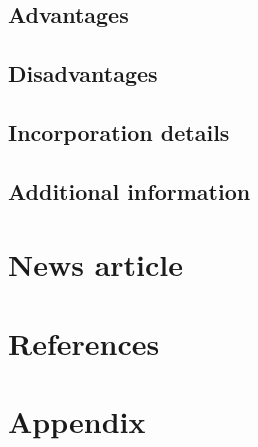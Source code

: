 \documentclass[12pt]{article}
\begin{document}
\subsection{Advantages}

\subsection{Disadvantages}

\subsection{Incorporation details}

\subsection{Additional information}


\section{News article}
\newpage


\pagestyle{fancy}
\newpage
\section{References}

\newpage

\section{Appendix}

\end{document}
